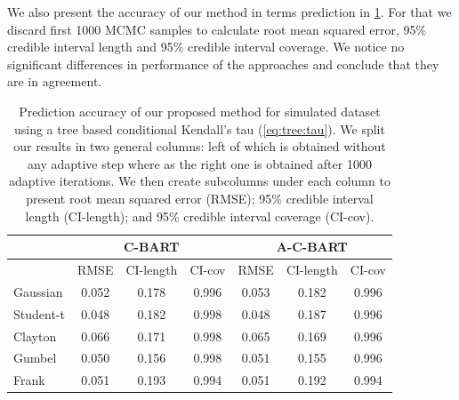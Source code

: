 \documentclass{amsart}
\begin{document}
We also present the accuracy of our method in terms prediction in \cref{tab:pred:ex1}. For that we discard first 1000 MCMC samples to calculate root mean squared error, 95\% credible interval length and 95\% credible interval coverage. We notice no significant differences in performance of the approaches and conclude that they are in agreement.

\begin{table}[ht]
	\centering
	\begin{tabular}{l|ccc|ccc}
		\multicolumn{1}{c|}{} &
		\multicolumn{3}{c|}{C-BART} &
		\multicolumn{3}{c}{A-C-BART} \\
		\midrule
		& RMSE & CI-length & CI-cov & RMSE & CI-length & CI-cov \\ 
		\midrule
		Gaussian & 0.052 & 0.178 & 0.996 & 0.053 & 0.182 & 0.996 \\ 
		Student-t & 0.048 & 0.182 & 0.998 & 0.048 & 0.187 & 0.996 \\ 
		Clayton & 0.066 & 0.171 & 0.998 & 0.065 & 0.169 & 0.996 \\ 
		Gumbel & 0.050 & 0.156 & 0.998 & 0.051 & 0.155 & 0.996 \\ 
		Frank & 0.051 & 0.193 & 0.994 & 0.051 & 0.192 & 0.994 \\ 
		\hline 
	\end{tabular}
	\caption{Prediction accuracy of our proposed method for simulated dataset using a tree based conditional Kendall's tau (\cref{eq:tree:tau}). We split our results in two general columns: left of which is obtained without any adaptive step where as the right one is obtained after 1000 adaptive iterations. We then create subcolumns under each column to present root mean squared error (RMSE); 95\% credible interval length (CI-length); and 95\% credible interval coverage (CI-cov).}
	\label{tab:pred:ex1}
\end{table}
\end{document}

